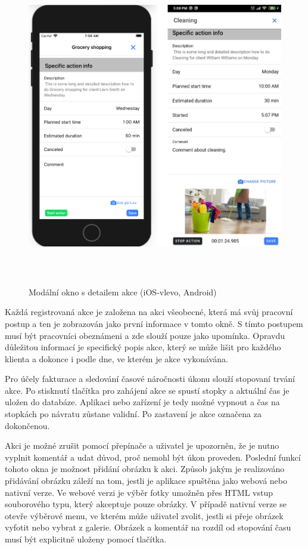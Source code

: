 \documentclass[
  biblatex,
  glossaries,
  index
]{kidiplom}
\begin{document}
\begin{figure}[H]
  	\centering
 	 \includegraphics[width=14cm,height=14cm,keepaspectratio]{actionDetail}
 	 \caption{Modální okno s detailem akce (iOS-vlevo, Android)}
 	 \label{fig:actionDetail}
\end{figure}

Každá registrovaná akce je založena na akci všeobecné, která má svůj pracovní postup a ten je zobrazován jako první informace v tomto okně. S tímto postupem musí být pracovníci obeznámeni a zde slouží pouze jako upomínka. Opravdu důležitou informací je specifický popis akce, který se může lišit pro každého klienta a dokonce i podle dne, ve kterém je akce vykonávána.

Pro účely fakturace a sledování časové náročnosti úkonu slouží stopovaní trvání akce. Po stisknutí tlačítka pro zahájení akce se spustí stopky a aktuální čas je uložen do databáze. Aplikaci nebo zařízení je tedy možné vypnout a čas na stopkách po návratu zůstane validní. Po zastavení je akce označena za dokončenou.

Akci je možné zrušit pomocí přepínače a uživatel je upozorněn, že je nutno vyplnit komentář a udat důvod, proč nemohl být úkon proveden. Poslední funkcí tohoto okna je možnost přidání obrázku k akci. Způsob jakým je realizováno přidávání obrázku záleží na tom, jestli je aplikace spuštěna jako webová nebo nativní verze. Ve webové verzi je výběr fotky umožněn přes HTML vstup souborového typu, který akceptuje pouze obrázky. V případě nativní verze se otevře výběrové menu, ve kterém může uživatel zvolit, jestli si přeje obrázek vyfotit nebo vybrat z galerie. Obrázek a komentář na rozdíl od stopování času musí být explicitně uloženy pomocí tlačítka. 
\end{document}
